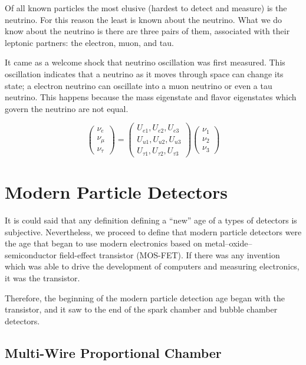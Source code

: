 Of all known particles the most elusive (hardest to detect and measure) is the neutrino.
For this reason the least is known about the neutrino.
What we do know about the neutrino is there are three pairs of them, associated with their leptonic partners: the electron, muon, and tau.

It came as a welcome shock that neutrino oscillation was first measured.
This oscillation indicates that a neutrino as it moves through space can change its state; a electron neutrino can oscillate into a muon neutrino or even a tau neutrino.
This happens because the mass eigenstate and flavor eigenstates which govern the neutrino are not equal.

\begin{equation}
\begin{pmatrix}
\nu_e\\
\nu_{\mu}\\
\nu_{\tau}
\end{pmatrix}
=
\begin{pmatrix}
U_{e1}, U_{e2}, U_{e3} \\
U_{u1}, U_{u2}, U_{u3} \\
U_{\tau1}, U_{\tau2}, U_{\tau3}
\end{pmatrix}
\begin{pmatrix}
\nu_1\\
\nu_2\\
\nu_3
\end{pmatrix}
\end{equation}


\section{Modern Particle Detectors}

It is could said that any definition defining a ``new'' age of a types of detectors is subjective.
Nevertheless, we proceed to define that modern particle detectors were the age that began to use modern electronics based on metal–oxide–semiconductor field-effect transistor (MOS-FET).
If there was any invention which was able to drive the development of computers and  measuring electronics, it was the transistor.

Therefore, the beginning of the modern particle detection age began with the transistor, and it saw to the end of the spark chamber and bubble chamber detectors.

\subsection{Multi-Wire Proportional Chamber}

